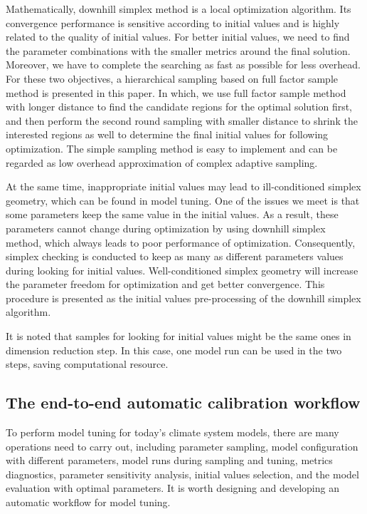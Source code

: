 \documentclass[gmd, manuscript]{copernicus}
\begin{document}
Mathematically, downhill simplex method is a local optimization algorithm. Its convergence performance is sensitive according to initial values and is highly related to the quality of initial values. For better initial values, we need to find the parameter combinations with the smaller metrics around the final solution. Moreover, we have to complete the searching as fast as possible for less overhead. For these two objectives, a hierarchical sampling based on full factor sample method is presented in this paper. In which, we use full factor sample method with longer distance to find the candidate regions for the optimal solution first, and then perform the second round sampling with smaller distance to shrink the interested regions as well to determine the final initial values for following optimization. The simple sampling method is easy to implement and can be regarded as low overhead approximation of complex adaptive sampling. 


At the same time, inappropriate initial values may lead to ill-conditioned simplex geometry, which can be found in model tuning. One of the issues we meet is that some parameters keep the same value in the initial values. As a result, these parameters cannot change during optimization by using downhill simplex method, which always leads to poor performance of optimization. Consequently, simplex checking is conducted to keep as many as different parameters values during looking for initial values. Well-conditioned simplex geometry will increase the parameter freedom for optimization and get better convergence. This procedure is presented as the initial values pre-processing of the downhill simplex algorithm.


It is noted that samples for looking for initial values might be the same ones in dimension reduction step. In this case, one model run can be used in the two steps, saving computational resource.


\subsection{The end-to-end automatic calibration workflow}

To perform model tuning for today’s climate system models, there are many operations need to carry out, including parameter sampling, model configuration with different parameters, model runs during sampling and tuning, metrics diagnostics, parameter sensitivity analysis, initial values selection, and the model evaluation with optimal parameters. It is worth designing and developing an automatic workflow for model tuning.
\end{document}

